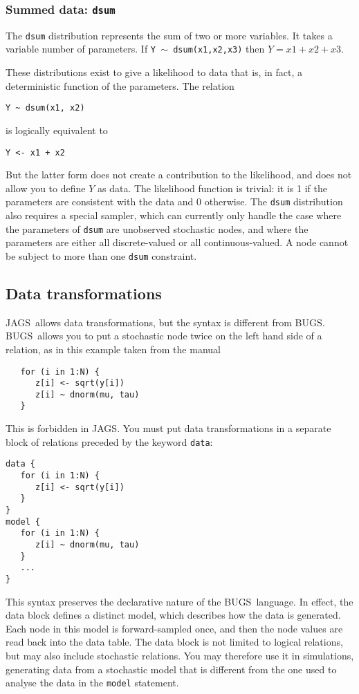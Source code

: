 \documentclass[11pt, a4paper, titlepage]{report}
\newcommand{\JAGS}{\textsf{JAGS}}
\newcommand{\BUGS}{\textsf{BUGS}}
\begin{document}
\subsubsection{Summed data: \texttt{dsum}}

The \texttt{dsum} distribution represents the sum of two or more
variables.  It takes a variable number of parameters. If \texttt{Y $\sim$
dsum(x1,x2,x3)} then $Y=x1+x2+x3$.

These distributions exist to give a likelihood to data that is, in fact,
a deterministic function of the parameters.  The relation
\begin{verbatim}
Y ~ dsum(x1, x2)
\end{verbatim}
is logically equivalent to
\begin{verbatim}
Y <- x1 + x2
\end{verbatim}
But the latter form does not create a contribution to the likelihood,
and does not allow you to define $Y$ as data.  The likelihood function
is trivial: it is 1 if the parameters are consistent with the data and
0 otherwise.  The \texttt{dsum} distribution also requires a special
sampler, which can currently only handle the case where the parameters
of \texttt{dsum} are unobserved stochastic nodes, and where the
parameters are either all discrete-valued or all continuous-valued. A node
cannot be subject to more than one \texttt{dsum} constraint.

\subsection{Data transformations}
\label{section:data:tranformations}

\JAGS\ allows data transformations, but the syntax is different from
\BUGS.  \BUGS\ allows you to put a stochastic node twice on the left
hand side of a relation, as in this example taken from the manual
\begin{verbatim}
   for (i in 1:N) {
      z[i] <- sqrt(y[i])
      z[i] ~ dnorm(mu, tau)
   }
\end{verbatim}
This is forbidden in \JAGS. You must put data transformations in a 
separate block of relations preceded by the keyword \texttt{data}:
\begin{verbatim}
data {
   for (i in 1:N) {
      z[i] <- sqrt(y[i])
   }
}
model {
   for (i in 1:N) {
      z[i] ~ dnorm(mu, tau)
   }
   ...
}
\end{verbatim}
This syntax preserves the declarative nature of the \BUGS\ language.
In effect, the data block defines a distinct model, which describes
how the data is generated. Each node in this model is forward-sampled
once, and then the node values are read back into the data table. The
data block is not limited to logical relations, but may also include
stochastic relations. You may therefore use it in simulations,
generating data from a stochastic model that is different from the one
used to analyse the data in the \texttt{model} statement.
\end{document}
